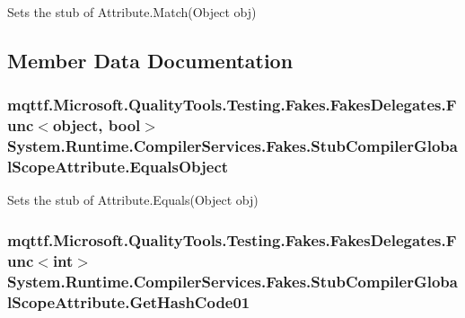 Sets the stub of Attribute.\-Match(\-Object obj)



\subsection{Member Data Documentation}
\hypertarget{class_system_1_1_runtime_1_1_compiler_services_1_1_fakes_1_1_stub_compiler_global_scope_attribute_a942734f8bb045f52fcac489bb008d434}{
\subsubsection[{Equals\-Object}]{\setlength{\rightskip}{0pt plus 5cm}mqttf.\-Microsoft.\-Quality\-Tools.\-Testing.\-Fakes.\-Fakes\-Delegates.\-Func$<$object, bool$>$ System.\-Runtime.\-Compiler\-Services.\-Fakes.\-Stub\-Compiler\-Global\-Scope\-Attribute.\-Equals\-Object}}\label{class_system_1_1_runtime_1_1_compiler_services_1_1_fakes_1_1_stub_compiler_global_scope_attribute_a942734f8bb045f52fcac489bb008d434}


Sets the stub of Attribute.\-Equals(\-Object obj)

\hypertarget{class_system_1_1_runtime_1_1_compiler_services_1_1_fakes_1_1_stub_compiler_global_scope_attribute_a8d59a8d1b7a8ba0339bb9084fe4ee28c}{
\subsubsection[{Get\-Hash\-Code01}]{\setlength{\rightskip}{0pt plus 5cm}mqttf.\-Microsoft.\-Quality\-Tools.\-Testing.\-Fakes.\-Fakes\-Delegates.\-Func$<$int$>$ System.\-Runtime.\-Compiler\-Services.\-Fakes.\-Stub\-Compiler\-Global\-Scope\-Attribute.\-Get\-Hash\-Code01}}\label{class_system_1_1_runtime_1_1_compiler_services_1_1_fakes_1_1_stub_compiler_global_scope_attribute_a8d59a8d1b7a8ba0339bb9084fe4ee28c}


